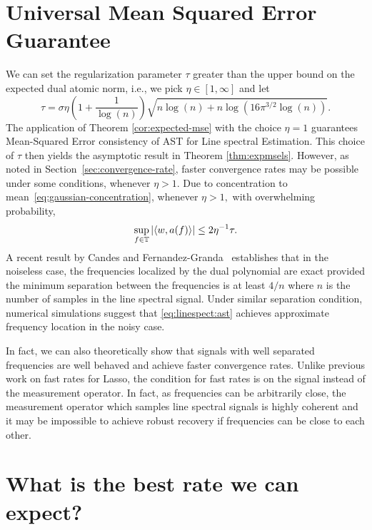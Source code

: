 \section{Universal Mean Squared Error Guarantee} %
\label{sec:universal-mse}

We can set the regularization parameter $\tau$ greater than the upper bound on the expected dual atomic norm, i.e., we pick $\eta \in [1,\infty]$ and let
\begin{equation}
\label{eq:tau}
\tau = \sigma\eta\left(1  +  \frac{1}{\log(n)}\right)\sqrt{n \log(n) + n\log(16\pi^{3/2}\log(n))}.
\end{equation}
The application of Theorem \ref{cor:expected-mse} with the choice $\eta = 1$ 
guarantees Mean-Squared Error consistency of AST for Line spectral Estimation.
This choice of $\tau$ then yields the asymptotic result in Theorem \ref{thm:expmsels}. However, as noted in Section~\ref{sec:convergence-rate}, faster convergence rates may be possible under some conditions, whenever $\eta > 1.$ Due to concentration to mean~\eqref{eq:gaussian-concentration}, whenever $\eta > 1,$ with overwhelming probability,
\begin{equation}
\label{eq:tau2}
\sup_{f \in \mathbb{T}} \left|\langle w, a(f)\rangle\right| \leq 2\eta^{-1}\tau.
\end{equation}
A recent result by Candes and Fernandez-Granda~\cite{CandesGranda} establishes
that in the noiseless case, the frequencies localized by the dual polynomial are
exact provided the minimum separation between the frequencies is at least $4/n$
where $n$ is the number of samples in the line spectral signal. Under similar
separation condition, numerical simulations suggest that \eqref{eq:linespect:ast} achieves
approximate frequency location in the noisy case.

In fact, we can also theoretically show that signals with well separated
frequencies are well behaved and achieve faster convergence rates. Unlike
previous work on fast rates for Lasso, the condition for fast rates is on the
signal instead of the measurement operator. In fact, as frequencies can be
arbitrarily close, the measurement operator which samples line spectral signals
is highly coherent and it may be impossible to achieve robust recovery if
frequencies can be close to each other.

\section{What is the best rate we can expect?}\label{sec:minimax}

